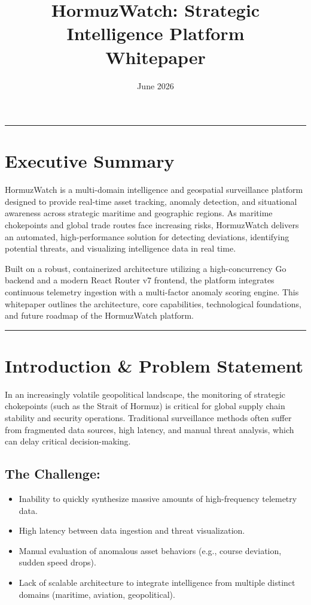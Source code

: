 \documentclass[11pt,a4paper]{article}
\title{\vspace{-2cm}\color{textprimary}\textbf{HormuzWatch: Strategic Intelligence Platform}\\\vspace{0.5cm}\Large\color{textsecondary}Whitepaper}
\author{\color{textsecondary}June 2026}
\date{}
\begin{document}
\maketitle
\thispagestyle{empty}

\noindent\textcolor{textsecondary}{\rule{\textwidth}{0.5pt}}

\section{Executive Summary}
HormuzWatch is a multi-domain intelligence and geospatial surveillance platform designed to provide real-time asset tracking, anomaly detection, and situational awareness across strategic maritime and geographic regions. As maritime chokepoints and global trade routes face increasing risks, HormuzWatch delivers an automated, high-performance solution for detecting deviations, identifying potential threats, and visualizing intelligence data in real time.

Built on a robust, containerized architecture utilizing a high-concurrency Go backend and a modern React Router v7 frontend, the platform integrates continuous telemetry ingestion with a multi-factor anomaly scoring engine. This whitepaper outlines the architecture, core capabilities, technological foundations, and future roadmap of the HormuzWatch platform.

\noindent\textcolor{textsecondary}{\rule{\textwidth}{0.5pt}}

\section{Introduction \& Problem Statement}
In an increasingly volatile geopolitical landscape, the monitoring of strategic chokepoints (such as the Strait of Hormuz) is critical for global supply chain stability and security operations. Traditional surveillance methods often suffer from fragmented data sources, high latency, and manual threat analysis, which can delay critical decision-making.

\subsection*{The Challenge:}
\begin{itemize}
    \item Inability to quickly synthesize massive amounts of high-frequency telemetry data.
    \item High latency between data ingestion and threat visualization.
    \item Manual evaluation of anomalous asset behaviors (e.g., course deviation, sudden speed drops).
    \item Lack of scalable architecture to integrate intelligence from multiple distinct domains (maritime, aviation, geopolitical).
\end{itemize}
\end{document}
